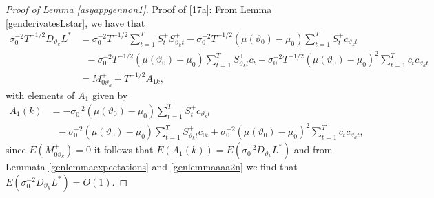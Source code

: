 {{\begin{proof}[Proof of Lemma \ref{asyappgennon1}]  Proof of \eqref{17a}:
From Lemma \ref{genderivatesLstar}, we have that 
\begin{align*}
\sigma_0^{-2} T^{-1/2} D_{\vartheta_k} L^*   &= \sigma_0^{-2} T^{-1/2} \sum_{t = 1}^T S_{t}^+  S_{\vartheta_k t}^+ - \sigma_0^{-2} T^{-1/2} \left(\mu(\vartheta_0)-\mu_0\right) \sum_{t = 1}^T S_{t}^+   c_{\vartheta_k t} \\
     &\ \ \ - \sigma_0^{-2} T^{-1/2} \left(\mu(\vartheta_0)-\mu_0\right)  \sum_{t = 1}^T  S_{\vartheta_k t}^+   c_{t} + \sigma_0^{-2} T^{-1/2} \left(\mu(\vartheta_0)-\mu_0\right)^2  \sum_{t = 1}^T c_{t}  c_{\vartheta_k t} \\
     &=  M_{0\vartheta_k}^{+} + T^{-1/2} A_{1k}, 
\end{align*}
with elements of $A_1$ given by
\begin{align*}
    A_{1}(k) &=  - \sigma_0^{-2}  \left(\mu(\vartheta_0)-\mu_0\right) \sum_{t = 1}^T S_{t}^+   c_{\vartheta_k t} \\
    &\ \ \ - \sigma_0^{-2} \left(\mu(\vartheta_0)-\mu_0\right)  \sum_{t = 1}^T  S_{\vartheta_k t}^+   c_{0t} + \sigma_0^{-2}\left(\mu(\vartheta_0)-\mu_0\right)^2  \sum_{t = 1}^T c_{t}  c_{\vartheta_k t}, 
\end{align*}
since $E( M_{0\vartheta_k}^{+}) = 0$ it follows that $E\left(A_{1}(k)\right) =   E\left(\sigma_0^{-2}  D_{\vartheta_k} L^*\right)$  and from Lemmata \ref{genlemmaexpectations} and \ref{genlemmaaaa2n} we find that $E\left(\sigma_0^{-2}  D_{\vartheta_k} L^*\right) = O(1)$.   




\end{proof}}}

